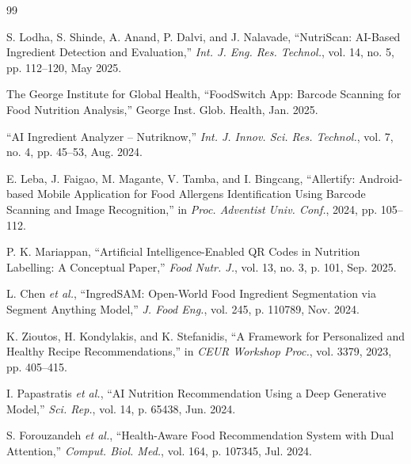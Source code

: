 \documentclass[conference]{IEEEtran}
\begin{document}
    \begin{thebibliography}{99}

    S. Lodha, S. Shinde, A. Anand, P. Dalvi, and J. Nalavade, ``NutriScan: AI-Based Ingredient Detection and Evaluation,'' \textit{Int. J. Eng. Res. Technol.}, vol. 14, no. 5, pp. 112--120, May 2025.
    \vspace{5pt}

    The George Institute for Global Health, ``FoodSwitch App: Barcode Scanning for Food Nutrition Analysis,'' George Inst. Glob. Health, Jan. 2025.
    \vspace{5pt}

    ``AI Ingredient Analyzer -- Nutriknow,'' \textit{Int. J. Innov. Sci. Res. Technol.}, vol. 7, no. 4, pp. 45--53, Aug. 2024.
    \vspace{5pt}

    E. Leba, J. Faigao, M. Magante, V. Tamba, and I. Bingcang, ``Allertify: Android-based Mobile Application for Food Allergens Identification Using Barcode Scanning and Image Recognition,'' in \textit{Proc. Adventist Univ. Conf.}, 2024, pp. 105--112.
    \vspace{5pt}

    P. K. Mariappan, ``Artificial Intelligence-Enabled QR Codes in Nutrition Labelling: A Conceptual Paper,'' \textit{Food Nutr. J.}, vol. 13, no. 3, p. 101, Sep. 2025.
    \vspace{5pt}

    L. Chen \textit{et al.}, ``IngredSAM: Open-World Food Ingredient Segmentation via Segment Anything Model,'' \textit{J. Food Eng.}, vol. 245, p. 110789, Nov. 2024.
    \vspace{5pt}

    K. Zioutos, H. Kondylakis, and K. Stefanidis, ``A Framework for Personalized and Healthy Recipe Recommendations,'' in \textit{CEUR Workshop Proc.}, vol. 3379, 2023, pp. 405--415.
    \vspace{5pt}

    I. Papastratis \textit{et al.}, ``AI Nutrition Recommendation Using a Deep Generative Model,'' \textit{Sci. Rep.}, vol. 14, p. 65438, Jun. 2024.
    \vspace{5pt}

    S. Forouzandeh \textit{et al.}, ``Health-Aware Food Recommendation System with Dual Attention,'' \textit{Comput. Biol. Med.}, vol. 164, p. 107345, Jul. 2024.
    \vspace{5pt}


\end{thebibliography}
\end{document}
